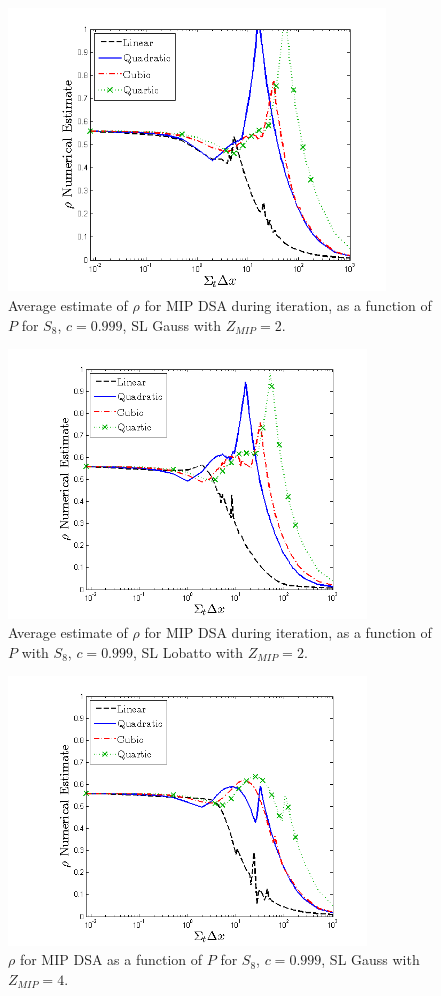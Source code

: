 %
%
%
\begin{figure}[!hbp]
\centering
\includegraphics[width=10cm]{chapter4_acceleration/Const_2_bar_Constant_XS_SN8_MIP_Gauss.png}
\caption{Average estimate of $\rho$ for MIP DSA during iteration, as a function of $P$ for  $S_8$, $c=0.999$, SL Gauss with $Z_{MIP}=2$.}
\label{fig:mip_gauss_c2_bar}
\end{figure}
%
\pagebreak

%
\begin{figure}[!htp]
\centering
\includegraphics[width=9.5cm]{chapter4_acceleration/Const_2_bar_Constant_XS_SN8_MIP_Lobatto.png}
\caption{Average estimate of $\rho$ for MIP DSA during iteration, as a function of $P$ with $S_8$, $c=0.999$,  SL Lobatto with $Z_{MIP}=2$.}
\label{fig:mip_lobatto_c2_bar}
\end{figure}

%
\begin{figure}[!hbp]
\centering
\includegraphics[width=9.5cm]{chapter4_acceleration/Const_4_Constant_XS_SN8_MIP_Gauss.png}
\caption{$\rho$ for MIP DSA as a function of $P$ for  $S_8$, $c=0.999$, SL Gauss with $Z_{MIP}=4$.}
\label{fig:mip_gauss_z4}
\end{figure}
%

